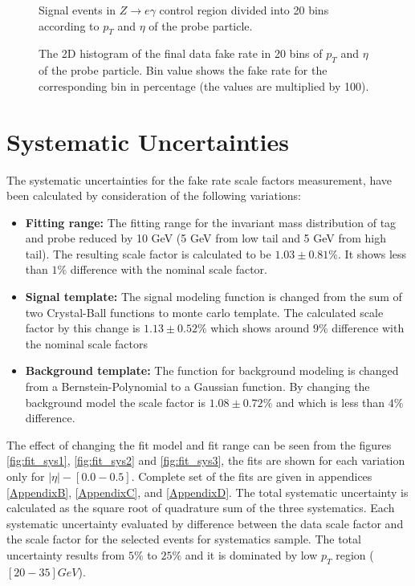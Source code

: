 \begin{figure}[H]
\begin{center}
\scalebox{0.6}{}
\caption{Signal events in $Z \rightarrow e\gamma$ control region divided into 20 bins according to $p_{T}$ and $\eta$ of the probe particle.}
\label{fig:h2_data_zeg_probe}
\end{center}
\end{figure}

\begin{figure}[H]
\begin{center}
\scalebox{0.6}{}
\caption{The 2D histogram of the final data fake rate in 20 bins of $p_{T}$ and $\eta$ of the probe particle. Bin value shows the fake rate for the corresponding bin in percentage (the values are multiplied by 100).}
\label{fig:h2_data_fc}
\end{center}
\end{figure}

\section{Systematic Uncertainties}
\label{systematic}

The systematic uncertainties for the fake rate scale factors measurement, have been calculated by consideration of the following variations:

\begin{itemize}
\item \textbf{Fitting range:} The fitting range for the invariant mass distribution of tag and probe reduced by 10 GeV (5 GeV from low tail and 5 GeV from high tail). The resulting scale factor is calculated to be $1.03\pm0.81\%$. It shows less than $1\%$ difference with the nominal scale factor.
\item \textbf{Signal template:} The signal modeling function is changed from the sum of two Crystal-Ball functions to monte carlo template. The calculated scale factor by this change is $1.13\pm0.52\%$ which shows around $9\%$ difference with the nominal scale factors
\item \textbf{Background template:} The function for background modeling is changed from a Bernstein-Polynomial to a Gaussian function. By changing the background model the scale factor is $1.08\pm0.72\%$ and which is less than $4\%$ difference.
\end{itemize}

The effect of changing the fit model and fit range can be seen from the figures \ref{fig:fit_sys1}, \ref{fig:fit_sys2} and \ref{fig:fit_sys3}, the fits are shown for each variation only for $|\eta|-[0.0-0.5]$. Complete set of the fits are given in appendices \ref{AppendixB}, \ref{AppendixC}, and \ref{AppendixD}. The total systematic uncertainty is calculated as the square root of quadrature sum of the three systematics. Each systematic uncertainty evaluated by difference between the data scale factor and the scale factor for the selected events for systematics sample. The total uncertainty results from $5\%$ to $25\%$ and it is dominated by low $p_{T}$ region ($[20-35]GeV$).

